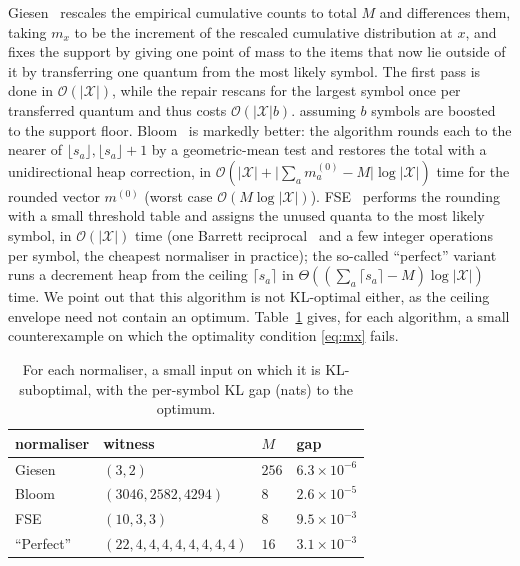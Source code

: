 \documentclass[final,5p]{elsarticle}
\begin{document}
Giesen~\cite{ryg_rans} rescales the empirical cumulative counts to total $M$ and
differences them, taking $m_x$ to be the increment of the rescaled cumulative
distribution at $x$, and fixes the support by giving one point of mass to the
items that now lie outside of it by transferring one quantum from the most likely
symbol. The first pass is done in $\mathcal{O}(|\mathcal X|)$, while the repair rescans for the largest symbol once per transferred quantum and thus costs $\mathcal{O}(|\mathcal X| b)$. assuming $b$ symbols are boosted to the
support floor. Bloom~\cite{Bloom2014ANS} is markedly better: the algorithm rounds each to the nearer of $\lfloor s_a\rfloor,\lfloor s_a\rfloor{+}1$ by a geometric-mean test and restores the total with a unidirectional heap
correction, in $\mathcal{O}\!\left(|\mathcal X|+\lvert\sum_a m^{(0)}_a-M\rvert\log
|\mathcal X|\right)$ time for the rounded vector $m^{(0)}$ (worst case
$\mathcal{O}(M\log |\mathcal X|)$). FSE~\cite{ColletFSE} performs the rounding with a small threshold table and assigns the unused
quanta to the most likely symbol, in $\mathcal{O}(|\mathcal X|)$ time (one Barrett
reciprocal~\cite{Barrett1986} and a few integer operations per symbol, the cheapest
normaliser in practice); the so-called ``perfect''
variant~\cite{Collet2014Perfect} runs a decrement heap from the ceiling $\lceil s_a\rceil$ in $\Theta\!\left((\sum_a\lceil s_a\rceil-M)\log |\mathcal X|\right)$
time. We point out that this algorithm is not KL-optimal either, as the ceiling envelope need not contain an optimum. Table~\ref{tab:wit} gives, for each algorithm, a small counterexample on which the optimality condition
\eqref{eq:mx} fails.

\begin{table}[t]
\centering
\caption{For each normaliser, a small input on which it is
KL-suboptimal, with the per-symbol KL gap (nats) to the optimum.}
\label{tab:wit}
\begin{tabular}{llll}
\hline
normaliser & witness & $M$ & gap \\
\hline
Giesen          & $(3,2)$               & $256$ & $6.3\times10^{-6}$ \\
Bloom           & $(3046,2582,4294)$    & $8$   & $2.6\times10^{-5}$ \\
FSE & $(10,3,3)$            & $8$   & $9.5\times10^{-3}$ \\
``Perfect''  & $(22,4,4,4,4,4,4,4,4)$& $16$  & $3.1\times10^{-3}$ \\
\hline
\end{tabular}
\end{table}
\end{document}
